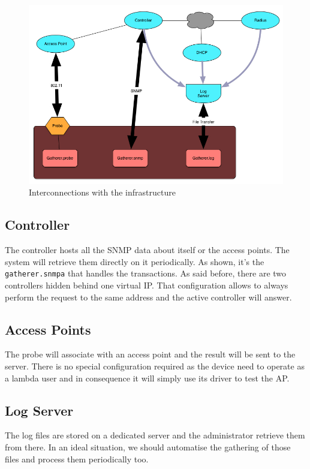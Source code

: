 \begin{figure}[H]
\centering
	\includegraphics[width=1\linewidth]{Pictures/chapter3/interactions.jpg}
	\caption{Interconnections with the infrastructure}
\end{figure}

\subsection{Controller}
The controller hosts all the SNMP data about itself or the access points. The system will retrieve them directly on it periodically. As shown, it's the \texttt{gatherer.snmpa} that handles the transactions. As said before, there are two controllers hidden behind one virtual IP. That configuration allows to always perform the request to the same address and the active controller will answer.
\subsection{Access Points}
The probe will associate with an access point and the result will be sent to the server. There is no special configuration required as the device need to operate as a lambda user and in consequence it will simply use its driver to test the AP. 
\subsection{Log Server} 
The log files are stored on a dedicated server and the administrator retrieve them from there. In an ideal situation, we should automatise the gathering of those files and process them periodically too.
